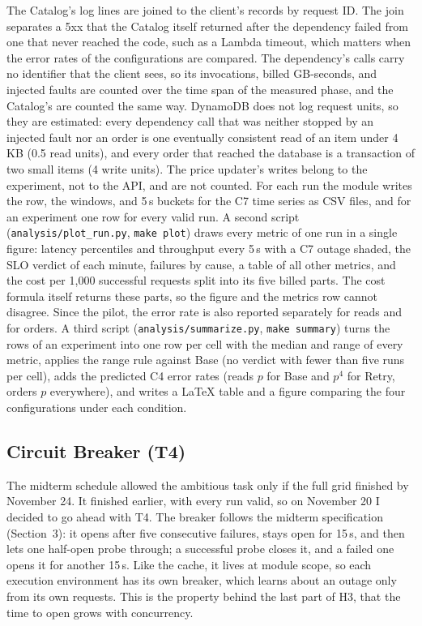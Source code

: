 \documentclass[10pt]{article}
\begin{document}
The Catalog's log lines are joined to the client's records by request ID.
The join separates a 5xx that the Catalog itself returned after the
dependency failed from one that never reached the code, such as a Lambda
timeout, which matters when the error rates of the configurations are
compared. The dependency's calls carry no identifier that the client sees, so
its invocations, billed GB-seconds, and injected faults are counted over the
time span of the measured phase, and the Catalog's are counted the same way.
DynamoDB does not log request units, so they are estimated: every dependency
call that was neither stopped by an injected fault nor an order is one
eventually consistent read of an item under 4\,KB (0.5 read units), and every
order that reached the database is a transaction of two small items (4 write
units). The price updater's writes belong to the experiment, not to the API,
and are not counted. For each run the module writes the row, the windows, and
5\,s buckets for the C7 time series as CSV files, and for an experiment one
row for every valid run. A second script (\texttt{analysis/plot\_run.py},
\texttt{make plot}) draws every metric of one run in a single figure: latency
percentiles and throughput every 5\,s with a C7 outage shaded, the SLO verdict
of each minute, failures by cause, a table of all other metrics, and the cost
per 1{,}000 successful requests split into its five billed parts. The cost
formula itself returns these parts, so the figure and the metrics row cannot
disagree. Since the pilot, the error rate is also reported separately for
reads and for orders. A third script (\texttt{analysis/summarize.py},
\texttt{make summary}) turns the rows of an experiment into one row per cell
with the median and range of every metric, applies the range rule against
Base (no verdict with fewer than five runs per cell), adds the predicted C4
error rates (reads $p$ for Base and $p^4$ for Retry, orders $p$ everywhere),
and writes a LaTeX table and a figure comparing the four configurations under
each condition.

\subsection{Circuit Breaker (T4)}\label{sec:t4impl}
The midterm schedule allowed the ambitious task only if the full grid finished
by November 24. It finished earlier, with every run valid, so on November 20 I
decided to go ahead with T4. The breaker follows the midterm specification
(Section~3): it opens after five consecutive failures, stays open for 15\,s,
and then lets one half-open probe through; a successful probe closes it, and a
failed one opens it for another 15\,s. Like the cache, it lives at module
scope, so each execution environment has its own breaker, which learns about
an outage only from its own requests. This is the property behind the last
part of H3, that the time to open grows with concurrency.
\end{document}
